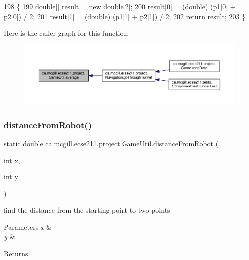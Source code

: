 \begin{DoxyCode}
198                                                      \{
199     \textcolor{keywordtype}{double}[] result = \textcolor{keyword}{new} \textcolor{keywordtype}{double}[2];
200     result[0] = (double) (p1[0] + p2[0]) / 2;
201     result[1] = (double) (p1[1] + p2[1]) / 2;
202     \textcolor{keywordflow}{return} result;
203   \}
\end{DoxyCode}
Here is the caller graph for this function\+:\nopagebreak
\begin{figure}[H]
\begin{center}
\leavevmode
\includegraphics[width=350pt]{classca_1_1mcgill_1_1ecse211_1_1project_1_1_game_util_ae5c5c445ab84516991219ca3783fcaa4_icgraph}
\end{center}
\end{figure}
\mbox{\label{classca_1_1mcgill_1_1ecse211_1_1project_1_1_game_util_ae373ebc3ec91ed3bf9dd7304a482a3f5}} 
\subsubsection{\texorpdfstring{distance\+From\+Robot()}{distanceFromRobot()}}
{\footnotesize\ttfamily static double ca.\+mcgill.\+ecse211.\+project.\+Game\+Util.\+distance\+From\+Robot (\begin{DoxyParamCaption}\item[{int}]{x,  }\item[{int}]{y }\end{DoxyParamCaption})\hspace{0.3cm}{\ttfamily [static]}}

find the distance from the starting point to two points


\begin{DoxyParams}{Parameters}
{\em x} & \\
\hline
{\em y} & \\
\hline
\end{DoxyParams}
\begin{DoxyReturn}{Returns}

\end{DoxyReturn}


